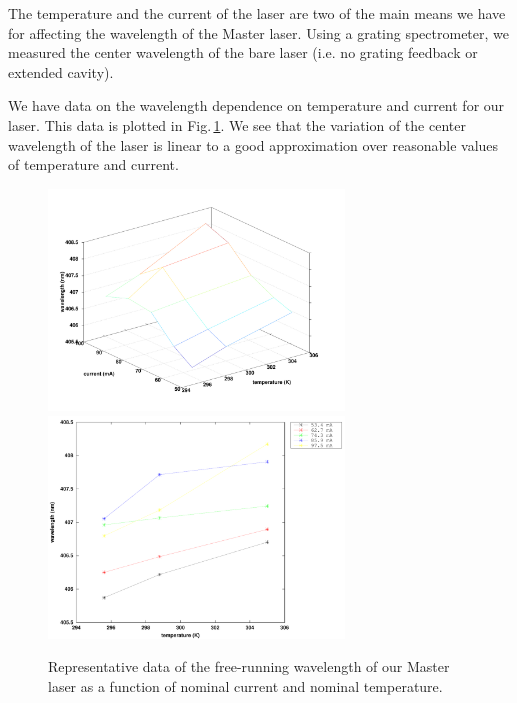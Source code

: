 The temperature and the current of the laser are two of the main means we have for affecting the wavelength of the Master laser. Using a grating spectrometer, we measured the center wavelength of the bare laser (i.e. no grating feedback or extended cavity).


We have data on the wavelength dependence on temperature and current for our laser. This data is plotted in Fig.\,\ref{3dCurrentandTgraph}. We see that the variation of the center wavelength of the laser is linear to a good approximation over reasonable values of temperature and current.

\begin{figure}
\centering
\includegraphics[width=0.7\textwidth]{TVlambda3} 
\includegraphics[width=0.7\textwidth]{TVlambda2}
\caption[Graph of Temperatures and Currents]{\label{3dCurrentandTgraph} Representative data of the free-running wavelength of our Master laser as a function of nominal current and nominal temperature.}
\end{figure}
